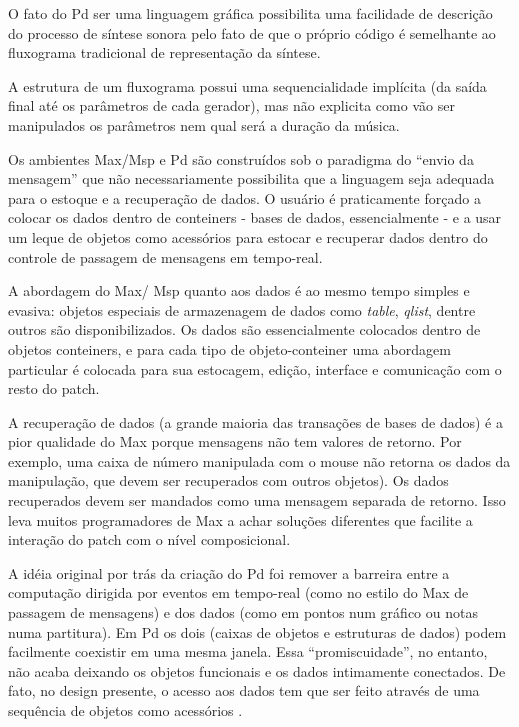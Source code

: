 \documentclass{ppgmus}
\begin{document}
O fato do Pd ser uma linguagem gráfica possibilita uma facilidade de
descrição do processo de síntese sonora pelo fato de que o próprio
código é semelhante ao fluxograma tradicional de representação da
síntese.

 A estrutura de um fluxograma
possui uma sequencialidade implícita (da saída final até os parâmetros
de cada gerador), mas não explicita como vão ser manipulados os
parâmetros nem qual será a duração da música.

Os ambientes Max/Msp e Pd são construídos sob o paradigma do ``envio
da mensagem'' que não necessariamente possibilita que a linguagem seja
adequada para o estoque e a recuperação de dados. O usuário é
praticamente forçado a colocar os dados dentro de conteiners - bases
de dados, essencialmente - e a usar um leque de objetos como
acessórios para estocar e recuperar dados dentro do controle de
passagem de mensagens em tempo-real.

A abordagem do Max/ Msp quanto aos dados é ao mesmo tempo simples e
evasiva: objetos especiais de armazenagem de dados como
\textit{table}, \textit{qlist}, dentre outros são disponibilizados. Os
dados são essencialmente colocados dentro de objetos conteiners, e
para cada tipo de objeto-conteiner uma abordagem particular é colocada
para sua estocagem, edição, interface e comunicação com o resto do
patch.

A recuperação de dados (a grande maioria das transações de bases de
dados) é a pior qualidade do Max porque mensagens não tem valores de
retorno. Por exemplo, uma caixa de número manipulada com o mouse não
retorna os dados da manipulação, que devem ser recuperados com outros
objetos). Os dados recuperados devem ser mandados como uma mensagem
separada de retorno. Isso leva muitos programadores de Max a achar
soluções diferentes que facilite a interação do patch com o nível
composicional.

A idéia original por trás da criação do Pd foi remover a barreira
entre a computação dirigida por eventos em tempo-real (como no estilo
do Max de passagem de mensagens) e dos dados (como em pontos num
gráfico ou notas numa partitura). Em Pd os dois (caixas de objetos e
estruturas de dados) podem facilmente coexistir em uma mesma janela.
Essa ``promiscuidade'', no entanto, não acaba deixando os objetos
funcionais e os dados intimamente conectados. De fato, no design
presente, o acesso aos dados tem que ser feito através de uma
sequência de objetos como acessórios .
\end{document}
